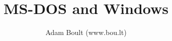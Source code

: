 \documentclass[oneside]{book}
\begin{document}
\author{Adam Boult (www.bou.lt)}
\title{MS-DOS and Windows}
\maketitle

\setcounter{tocdepth}{0}
\tableofcontents


\end{document}
